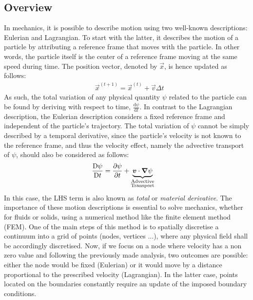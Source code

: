 \subsection{Overview}
In mechanics, it is possible to describe motion using two well-known descriptions: Eulerian and Lagrangian.
To start with the latter, it describes the motion of a particle by attributing a reference frame that moves with the particle.
In other words, the particle itself is the center of a reference frame moving at the same speed during time. 
The position vector, denoted by $\vec{x}$, is hence updated as follows:
\begin{align}
\label{eq:lagrangian}
& \vec{x}^{(t+1)}  = \vec{x}^{(t)} + \vec{v} \Delta t
\end{align}
As such, the total variation of any physical quantity $\psi$ related to the particle 
can be found by deriving with respect to time, $\frac{\mathrm{d} \psi}{\mathrm{d} t}$.
%
In contrast to the Lagrangian description, the Eulerian description considers a 
fixed reference frame and independent of the particle's trajectory. The total variation of $\psi$
cannot be simply described by a temporal derivative, since the particle's velocity is not known to 
the reference frame, and thus the velocity effect, namely the advective transport of $\psi$, should also be considered as follows:
\begin{align}
\label{eq:eulerian}
& \frac{\mathrm{D} \psi}{\mathrm{D} t} = \frac{\partial \psi}{\partial t} 
   + \underbrace{\boldsymbol{v} \cdot \boldsymbol{\nabla} \psi}_{\substack{\text{Advective} \\ \text{Transport}}}  
\end{align}
In this case, the LHS term is also known as \emph{total} or \emph{material derivative}.
The importance of these motion descriptions is essential to solve mechanics, whether for 
fluids or solids, using a numerical method like the finite element method (FEM). One of 
the main steps of this method is to spatially discretise a continuum into a grid of points 
(nodes, vertices ...), where any physical field shall be accordingly discretised. Now, if 
we focus on a node where velocity has a non zero value and following the previously made 
analysis, two outcomes are possible: either the node would be fixed (Eulerian) or it would 
move by a distance proportional to the prescribed velocity (Lagrangian). In the latter case,
points located on the boundaries constantly require an update of the imposed boundary conditions.

